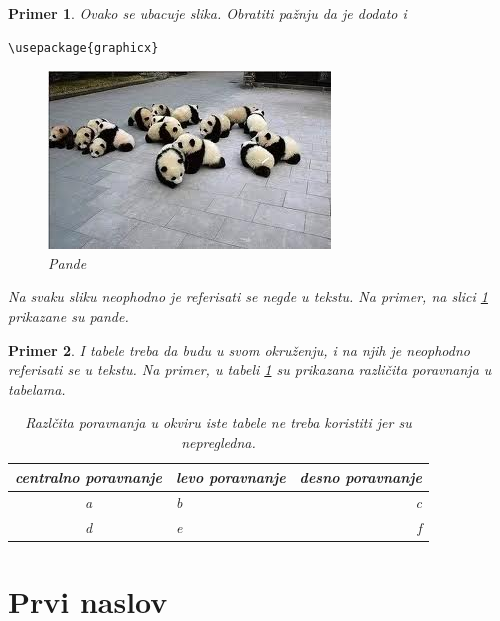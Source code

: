 \documentclass[a4paper]{article}
\newtheorem{primer}{Primer}[section]
\begin{document}
{\begin{primer} Ovako se ubacuje slika. Obratiti pažnju da je dodato i 
\begin{verbatim}
\usepackage{graphicx}
\end{verbatim}

\begin{figure}[h!]
\begin{center}
\includegraphics[scale=0.75]{panda.jpg}
\end{center}
\caption{Pande}
\label{fig:pande}
\end{figure}

Na svaku sliku neophodno je referisati se negde u tekstu. Na primer, na slici \ref{fig:pande} prikazane su pande. 
\end{primer}

\begin{primer} I tabele treba da budu u svom okruženju, i na njih je neophodno referisati se u tekstu. Na primer, u tabeli \ref{tab:tabela1} su prikazana različita poravnanja u tabelama.

\begin{table}[h!]
\begin{center}
\caption{Razlčita poravnanja u okviru iste tabele ne treba koristiti jer su nepregledna.}
\begin{tabular}{|c|l|r|} \hline
centralno poravnanje& levo poravnanje& desno poravnanje\\ \hline
a &b&c\\ \hline
d &e&f\\ \hline
\end{tabular}
\label{tab:tabela1}
\end{center}
\end{table}

\end{primer}

\section{Prvi naslov}
\label{sec:naslov1}


}
\end{document}
